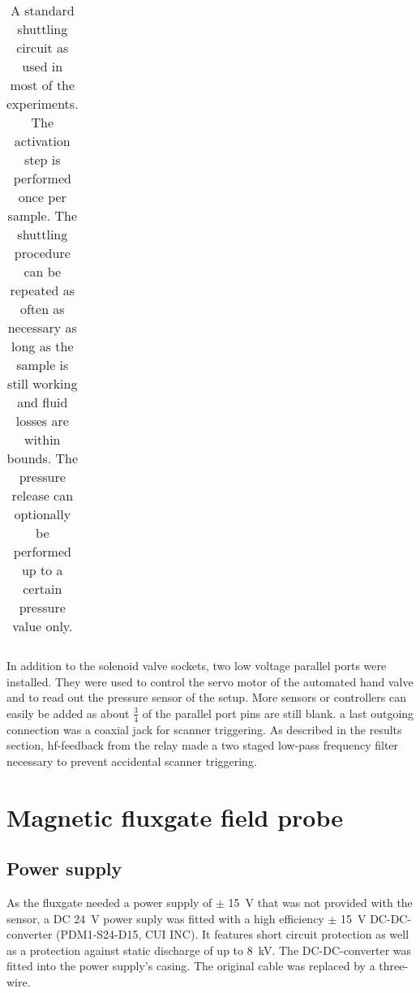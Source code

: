 \begin{table}
\begin{tabular}{| l | c | cccc | ccc | r |}
                    \hline 
                \end{tabular}
                \caption[15N hyperpolarization steps]{A standard shuttling circuit as used in most of the experiments. The activation step is performed once per sample. The shuttling procedure can be repeated as often as necessary as long as the sample is still working and fluid losses are within bounds. The pressure release can optionally be performed up to a certain pressure value only.}
            \end{table}
            In addition to the solenoid valve sockets, two low voltage parallel ports were installed.  They were used to control the servo motor of the automated hand valve and to read out the pressure sensor of the setup.  More sensors or controllers can easily be added as about $\frac{3}{4}$ of the parallel port pins are still blank.
            a last outgoing connection was a coaxial jack for scanner triggering.  As described in the results section, hf-feedback from the relay made a two staged low-pass frequency filter necessary to prevent accidental scanner triggering.
    \section{Magnetic fluxgate field probe}\label{sec:methodsfluxgate}
        \subsection{Power supply}
        As the fluxgate needed a power supply of $\pm$ \SI{15}{\volt} that was not provided with the sensor, a DC \SI{24}{\volt} power suply was fitted with a high efficiency $\pm$ \SI{15}{\volt} DC-DC-converter (PDM1-S24-D15, CUI INC). It features short circuit protection as well as a protection against static discharge of up to \SI{8}{\kilo\volt}. The DC-DC-converter was fitted into the power supply's casing. The original cable was replaced by a three-wire.
